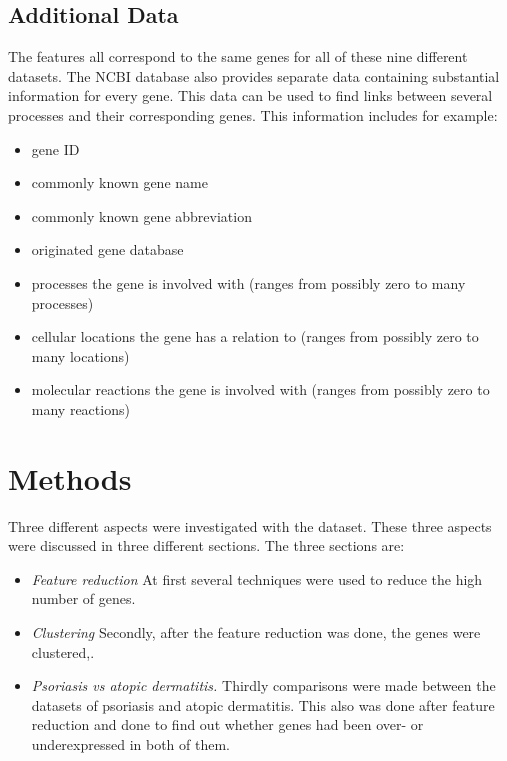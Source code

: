 \documentclass[10pt,a4paper]{article}
\begin{document}
	\subsection{Additional Data}
	\label{subsec:AdditionalData}
	
	The features all correspond to the same genes for all of these nine different datasets. The NCBI database\cite{edgar2002gene} also provides separate data containing substantial information for every gene. This data can be used to find links between several processes and their corresponding genes. This information includes for example:
	
	\begin{itemize}
		\item gene ID
		\item commonly known gene name
		\item commonly known gene abbreviation
		\item originated gene database
		\item processes the gene is involved with (ranges from possibly zero to many processes)
		\item cellular locations the gene has a relation to (ranges from possibly zero to many locations)
		\item molecular reactions the gene is involved with (ranges from possibly zero to many reactions)
	\end{itemize}
	
	\section{Methods}
	\label{sec:Methods}
	
	Three different aspects were investigated with the dataset. These three aspects were discussed in three different sections. The three sections are:
	\begin{itemize}
		\item  \textit{Feature reduction} At first several techniques were used to reduce the high number of genes.
		\item  \textit{Clustering}	Secondly, after the feature reduction was done, the genes were clustered,.
		\item	\textit{Psoriasis vs atopic dermatitis.} Thirdly comparisons were made between the datasets of psoriasis and atopic dermatitis. This also was done after feature reduction and done to find out whether genes had been over- or underexpressed in both of them.
	\end{itemize} 
	
\end{document}
